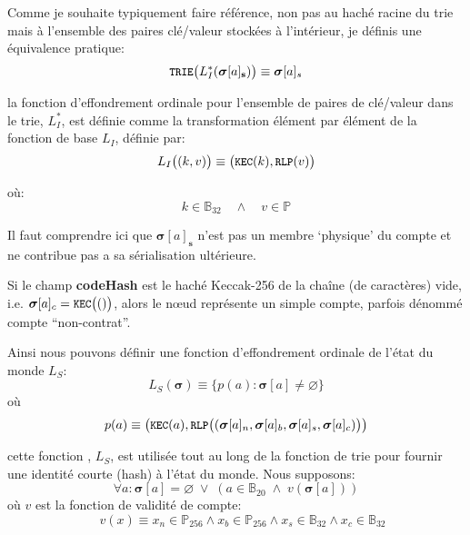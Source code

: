 \documentclass[9pt,oneside]{amsart}
\begin{document}
\begin{multicols}{2}
Comme je souhaite typiquement faire référence, non pas au haché racine du trie mais à l'ensemble des paires clé/valeur stockées à l'intérieur, je définis une équivalence pratique: 
\begin{equation}
\texttt{\small TRIE}\big(L_I^*(\boldsymbol{\sigma}[a]_\mathbf{s})\big) \equiv \boldsymbol{\sigma}[a]_s
\end{equation}

la fonction d'effondrement ordinale pour l'ensemble de paires de clé/valeur dans le trie, $L_I^*$, est définie comme la transformation élément par élément de la fonction de base $L_I$, définie par:
\begin{equation}
L_I\big( (k, v) \big) \equiv \big(\texttt{\small KEC}(k), \texttt{\small RLP}(v)\big)
\end{equation}

où:
\begin{equation}
k \in \mathbb{B}_{32} \quad \wedge \quad v \in \mathbb{P}
\end{equation}

Il faut comprendre ici que $\boldsymbol{\sigma}[a]_\mathbf{s}$ n'est pas un membre `physique' du compte et ne contribue pas a sa sérialisation ultérieure.

Si le champ \textbf{codeHash} est le haché Keccak-256 de la chaîne (de caractères) vide, i.e. $\boldsymbol{\sigma}[a]_c = \texttt{\small KEC}\big(()\big)$, alors le n\oe{}ud représente un simple compte, parfois dénommé compte ``non-contrat''.

Ainsi nous pouvons définir une fonction d'effondrement ordinale de l'état du monde $L_S$:
\begin{equation}
L_S(\boldsymbol{\sigma}) \equiv \{ p(a): \boldsymbol{\sigma}[a] \neq \varnothing \}
\end{equation}
où
\begin{equation}
p(a) \equiv  \big(\texttt{\small KEC}(a), \texttt{\small RLP}\big( (\boldsymbol{\sigma}[a]_n, \boldsymbol{\sigma}[a]_b, \boldsymbol{\sigma}[a]_s, \boldsymbol{\sigma}[a]_c) \big) \big)
\end{equation}

cette fonction , $L_S$, est utilisée tout au long de la fonction de trie pour fournir une identité courte (hash) à l'état du monde. Nous supposons:
\begin{equation}
\forall a: \boldsymbol{\sigma}[a] = \varnothing \; \vee \; (a \in \mathbb{B}_{20} \; \wedge \; v(\boldsymbol{\sigma}[a]))
\end{equation}
où $v$ est la fonction de validité de compte:
\begin{equation}
\quad v(x) \equiv x_n \in \mathbb{P}_{256} \wedge x_b \in \mathbb{P}_{256} \wedge x_s \in \mathbb{B}_{32} \wedge x_c \in \mathbb{B}_{32}
\end{equation}


\end{multicols}
\end{document}
